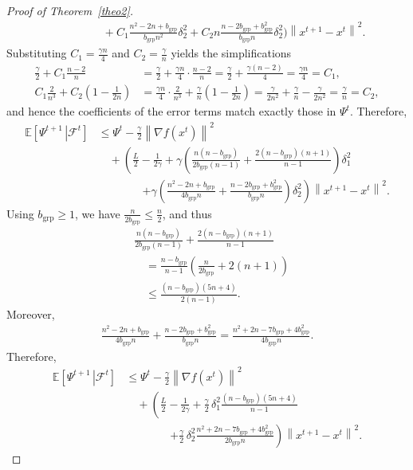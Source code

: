 \documentclass{article}
\newcommand{\sqn}[1]{\left\| #1 \right\|^2}
\newcommand{\Expb}[2]{\mathbb{E}\!\left[\left. #1\,\right|#2 \right]}
\newcommand{\Expc}[1]{\Expb{#1}{\mathcal{F}^t}}
\theoremstyle{plain}
\begin{document}
\begin{proof}[Proof of Theorem~\ref{theo2}]
\begin{align*}
&\qquad\qquad
+C_1\frac{n^2-2n+b_{\mathrm{grp}}}{b_{\mathrm{grp}}n^2}\delta_2^2
+C_2n\frac{n-2b_{\mathrm{grp}}+b_{\mathrm{grp}}^2}{b_{\mathrm{grp}}n}\delta_2^2\Bigg)\sqn{x^{t+1}-x^t}.
\end{align*}
Substituting $C_1=\frac{\gamma n}{4}$ and $C_2=\frac{\gamma}{n}$ yields the simplifications
\begin{align*}
\frac{\gamma}{2}+C_1\frac{n-2}{n}
&=\frac{\gamma}{2}+\frac{\gamma n}{4}\cdot\frac{n-2}{n}
=\frac{\gamma}{2}+\frac{\gamma(n-2)}{4}
=\frac{\gamma n}{4}=C_1,\\
C_1\frac{2}{n^3}+C_2\left(1-\frac{1}{2n}\right)
&=\frac{\gamma n}{4}\cdot\frac{2}{n^3}+\frac{\gamma}{n}\left(1-\frac{1}{2n}\right)
=\frac{\gamma}{2n^2}+\frac{\gamma}{n}-\frac{\gamma}{2n^2}
=\frac{\gamma}{n}=C_2,
\end{align*}
and hence the coefficients of the error terms match exactly those in $\Psi^t$. Therefore,
\begin{align*}
\Expc{\Psi^{t+1}}
&\leq \Psi^t-\frac{\gamma}{2}\sqn{\nabla f(x^t)}\\
&\quad+\left(\frac{L}{2}-\frac{1}{2\gamma}
+\gamma\left(\frac{n(n-b_{\mathrm{grp}})}{2b_{\mathrm{grp}}(n-1)}
+\frac{2(n-b_{\mathrm{grp}})(n+1)}{n-1}\right)\delta_1^2\right.\\
&\qquad\qquad\left.
+\gamma\left(\frac{n^2-2n+b_{\mathrm{grp}}}{4b_{\mathrm{grp}}n}
+\frac{n-2b_{\mathrm{grp}}+b_{\mathrm{grp}}^2}{b_{\mathrm{grp}}n}\right)\delta_2^2\right)\sqn{x^{t+1}-x^t}.
\end{align*}
Using $b_{\mathrm{grp}}\geq 1$, we have $\frac{n}{2b_{\mathrm{grp}}}\leq \frac{n}{2}$, and thus
\begin{align*}
&\frac{n(n-b_{\mathrm{grp}})}{2b_{\mathrm{grp}}(n-1)}
+\frac{2(n-b_{\mathrm{grp}})(n+1)}{n-1}\\
&\quad=\frac{n-b_{\mathrm{grp}}}{n-1}\left(\frac{n}{2b_{\mathrm{grp}}}+2(n+1)\right)\\
&\quad\leq \frac{(n-b_{\mathrm{grp}})(5n+4)}{2(n-1)}.
\end{align*}
Moreover,
\begin{align*}
\frac{n^2-2n+b_{\mathrm{grp}}}{4b_{\mathrm{grp}}n}+\frac{n-2b_{\mathrm{grp}}+b_{\mathrm{grp}}^2}{b_{\mathrm{grp}}n}
=\frac{n^2+2n-7b_{\mathrm{grp}}+4b_{\mathrm{grp}}^2}{4b_{\mathrm{grp}}n}.
\end{align*}
Therefore,
\begin{align*}
\Expc{\Psi^{t+1}}
&\leq \Psi^t-\frac{\gamma}{2}\sqn{\nabla f(x^t)} \\
&\quad+\left(\frac{L}{2}-\frac{1}{2\gamma}
+\frac{\gamma}{2}\,\delta_1^2\frac{(n-b_{\mathrm{grp}})(5n+4)}{n-1}\right.\\
&\qquad\qquad\left.
+\frac{\gamma}{2}\,\delta_2^2\frac{n^2+2n-7b_{\mathrm{grp}}+4b_{\mathrm{grp}}^2}{2b_{\mathrm{grp}}n}\right)
\sqn{x^{t+1}-x^t}.
\end{align*}


\end{proof}
\end{document}
